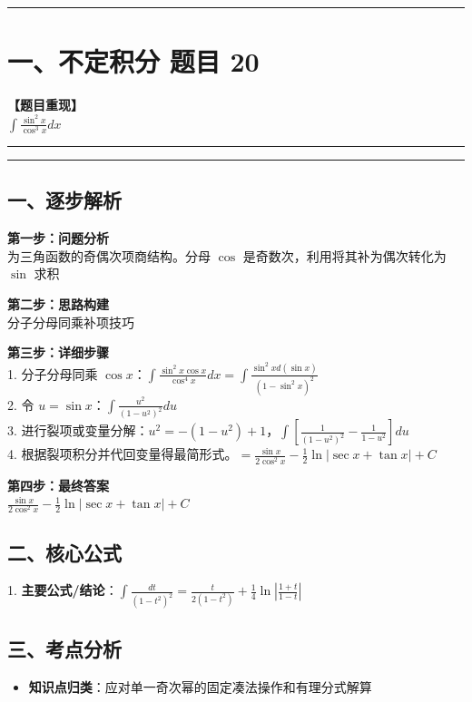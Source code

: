﻿\documentclass[12pt, a4paper]{ctexart}
\newcommand{\TopSeparator}{
    \par\noindent\rule{\textwidth}{1.5pt}\vspace{0.5em}
}
\newcommand{\AnalysisSeparator}{
    \par\noindent\rule{\textwidth}{0.5pt}\vspace{0.2em}\hrule\vspace{0.5em}
}
\newenvironment{RedAnalysis}{
    \par
    \color{red} 
}{
    \par
    \color{black} 
}
\begin{document}
\vspace{2em}

\TopSeparator
\section*{一、不定积分 题目 20}

\textbf{【题目重现】} \\
$\int \frac{\sin^2 x}{\cos^3 x} dx$

\AnalysisSeparator

\begin{RedAnalysis}

	\subsection*{一、逐步解析}

	\textbf{第一步：问题分析} \\
	为三角函数的奇偶次项商结构。分母 $\cos$ 是奇数次，利用将其补为偶次转化为 $\sin$ 求积

	\textbf{第二步：思路构建} \\
	分子分母同乘补项技巧

	\textbf{第三步：详细步骤} \\
	1. 分子分母同乘 $\cos x$：$\int \frac{\sin^2 x \cos x}{\cos^4 x} dx = \int \frac{\sin^2 x d(\sin x)}{(1-\sin^2 x)^2}$ \\ 
	2. 令 $u = \sin x$：$\int \frac{u^2}{(1-u^2)^2} du$ \\ 
	3. 进行裂项或变量分解：$u^2 = -(1-u^2)+1$，$\int [ \frac{1}{(1-u^2)^2} - \frac{1}{1-u^2} ] du$ \\ 
	4. 根据裂项积分并代回变量得最简形式。$= \frac{\sin x}{2\cos^2 x} - \frac{1}{2}\ln|\sec x+\tan x| + C$

	\textbf{第四步：最终答案} \\
	$\frac{\sin x}{2\cos^2 x} - \frac{1}{2}\ln|\sec x+\tan x| + C$

	\subsection*{二、核心公式}
	1. \textbf{主要公式/结论}：$\int \frac{dt}{(1-t^2)^2} = \frac{t}{2(1-t^2)} + \frac{1}{4}\ln\left|\frac{1+t}{1-t}\right|$

	\subsection*{三、考点分析}
	\begin{itemize}
		\item \textbf{知识点归类}：应对单一奇次幂的固定凑法操作和有理分式解算
	\end{itemize}

\end{RedAnalysis}
\end{document}
